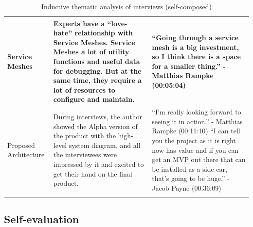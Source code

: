 \begin{longtable}{|p{30mm}|p{61mm}|p{60mm}|}
    
    Service Meshes &
    Experts have a “love-hate” relationship with Service Meshes. Service Meshes a lot of utility functions and useful data for debugging. But at the same time, they require a lot of resources to configure and maintain. &
    “Going through a service mesh is a big investment, so I think there is a space for a smaller thing.” \newline- Matthias Rampke (00:05:04) \\ \hline
    
    Proposed Architecture &
    During interviews, the author showed the Alpha version of the product with the high-level system diagram, and all the interviewees were impressed by it and excited to get their hand on the final product. &
    “I'm really looking forward to seeing it in action.”  \newline- Matthias Rampke (00:11:10)
    \newline
    \newline
    “I can tell you the project as it is right now has value and if you can get an MVP out there that can be installed as a side car, that's going to be huge.” \newline- Jacob Payne (00:36:09) \\ \hline

\caption{Inductive thematic analysis of interviews (self-composed)}
\end{longtable}

\subsection{Self-evaluation}



